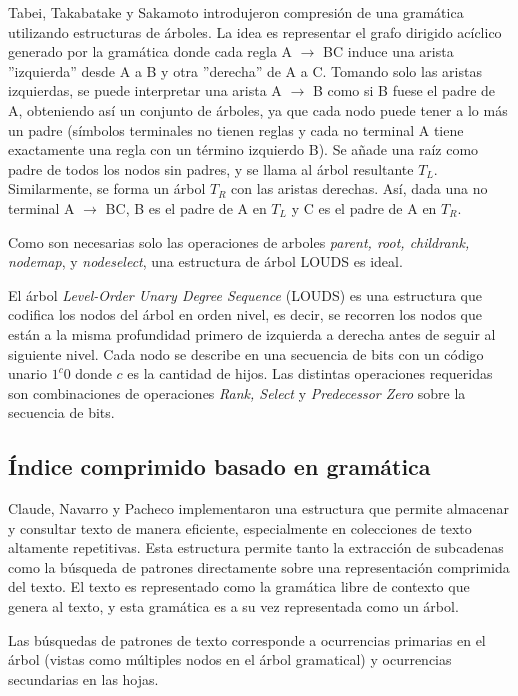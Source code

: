Tabei, Takabatake y Sakamoto introdujeron compresión de una gramática utilizando estructuras de árboles\cite{Tabei2013}. La idea es representar el grafo dirigido acíclico generado por la gramática donde cada regla A $\rightarrow$ BC induce una arista ''izquierda'' desde A a B y otra ''derecha'' de A a C. Tomando solo las aristas izquierdas, se puede interpretar una arista A $\rightarrow$ B como si B fuese el padre de A, obteniendo así un conjunto de árboles, ya que cada nodo puede tener a lo más un padre (símbolos terminales no tienen reglas y cada no terminal A tiene exactamente una regla con un término izquierdo B). Se añade una raíz como padre de todos los nodos sin padres, y se llama al árbol resultante $T_L$. Similarmente, se forma un árbol $T_R$ con las aristas derechas. Así, dada una no terminal A $\rightarrow$ BC, B es el padre de A en $T_L$ y C es el padre de A en $T_R$.

Como son necesarias solo las operaciones de arboles \textit{parent, root, childrank, nodemap}, y \textit{nodeselect}, una estructura de árbol LOUDS es ideal. 

El árbol \textit{Level-Order Unary Degree Sequence} (LOUDS) es una estructura que codifica los nodos del árbol en orden nivel, es decir, se recorren los nodos que están a la misma profundidad primero de izquierda a derecha antes de seguir al siguiente nivel. Cada nodo se describe en una secuencia de bits con un código unario $1^{c}0$ donde $c$ es la cantidad de hijos. Las distintas operaciones requeridas son combinaciones de operaciones \textit{Rank, Select} y \textit{Predecessor Zero} sobre la secuencia de bits.

\subsection{Índice comprimido basado en gramática}

Claude, Navarro y Pacheco\cite{claude2020} implementaron una estructura que permite almacenar y consultar texto de manera eficiente, especialmente en colecciones de texto altamente repetitivas. Esta estructura permite tanto la extracción de subcadenas como la búsqueda de patrones directamente sobre una representación comprimida del texto. El texto es representado como la gramática libre de contexto que genera al texto, y esta gramática es a su vez representada como un árbol.

Las búsquedas de patrones de texto corresponde a ocurrencias primarias en el árbol (vistas como múltiples nodos en el árbol gramatical) y ocurrencias secundarias en las hojas. 

